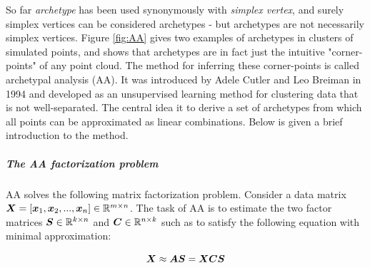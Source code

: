 So far \textit{archetype} has been used synonymously with \textit{simplex vertex}, and surely simplex vertices can be considered archetypes - but archetypes are not necessarily simplex vertices. Figure \ref{fig:AA} gives two examples of archetypes in clusters of simulated points, and shows that archetypes are in fact just the intuitive "corner-points" of any point cloud.
The method for inferring these corner-points is called archetypal analysis (AA). It was introduced by Adele Cutler and Leo Breiman in 1994 and developed as an unsupervised learning method for clustering data that is not well-separated. The central idea it to derive a set of archetypes from which all points can be approximated as linear combinations. Below is given a brief introduction to the method.

\subparagraph{The AA factorization problem}
AA solves the following matrix factorization problem. Consider a data matrix $\bm{X} = [\bm{x}_1, \bm{x}_2, ..., \bm{x}_n] \in \mathbb{R}^{m \times n}$. The task of AA is to estimate the two factor matrices $\bm{S} \in \mathbb{R}^{k \times n}$  and $\bm{C} \in \mathbb{R}^{n \times k}$ such as to satisfy the following equation with minimal approximation:

\begin{equation}
	\bm{X} \approx \bm{AS} = \bm{XCS}
	\label{eq:AA}
\end{equation}

